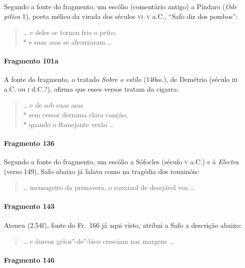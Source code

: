 {\small Segundo a fonte do fragmento, um escólio (comentário antigo) a Píndaro
(\textit{Ode pítica} 1), poeta mélico da virada dos séculos \textsc{vi}--\textsc{v} a.C.,
``Safo diz dos pombos”:}

\begin{verse}
\ldots{} e deles se tornou frio o peito,\\*
e suas asas se afrouxaram \ldots{}
\end{verse}

\paragraph{Fragmento 101a}

{\small A fonte do fragmento, o tratado \textit{Sobre o estilo} (140ss.), de Demétrio (século \textsc{iii}
a.C. ou \textsc{i} d.C.?), afirma que esses versos tratam da cigarra:}

\begin{verse}
\ldots{} e de sob suas asas\\*
sem cessar derrama clara canção,\\*
quando o flamejante verão \ldots{}
\end{verse}

\paragraph{Fragmento 136}

{\small Segundo a fonte do fragmento, um escólio a Sófocles (século \textsc{v} a.C.) e à
\textit{Electra }(verso 149), Safo abaixo já falava como na tragédia dos
rouxinóis:}

\begin{verse}
\ldots{} mensageiro da primavera, o rouxinol de \qb{}desejável voz \ldots{}
\end{verse}

\paragraph{Fragmento 143}

{\small Ateneu (2.54f), fonte do Fr.~166 já aqui visto, atribui a Safo a descrição abaixo:}

\begin{verse}
\ldots{} e áureos grãos"-de"-bico cresciam nas \qb{}margens \ldots{}
\end{verse}

\paragraph{Fragmento 146}

